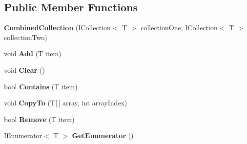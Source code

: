 \subsection*{Public Member Functions}
\begin{DoxyCompactItemize}
\item 
\hypertarget{class_cloud_api_public_1_1_model_1_1_combined_collection_3_01_t_01_4_abc00f26a4aadc898fa9617be0cee7f1b}{{\bfseries Combined\-Collection} (I\-Collection$<$ T $>$ collection\-One, I\-Collection$<$ T $>$ collection\-Two)}\label{class_cloud_api_public_1_1_model_1_1_combined_collection_3_01_t_01_4_abc00f26a4aadc898fa9617be0cee7f1b}

\item 
\hypertarget{class_cloud_api_public_1_1_model_1_1_combined_collection_3_01_t_01_4_a5852fb86510a176108a77257db1bef6d}{void {\bfseries Add} (T item)}\label{class_cloud_api_public_1_1_model_1_1_combined_collection_3_01_t_01_4_a5852fb86510a176108a77257db1bef6d}

\item 
\hypertarget{class_cloud_api_public_1_1_model_1_1_combined_collection_3_01_t_01_4_a31a9fdcf826637b5692bb74e1778424e}{void {\bfseries Clear} ()}\label{class_cloud_api_public_1_1_model_1_1_combined_collection_3_01_t_01_4_a31a9fdcf826637b5692bb74e1778424e}

\item 
\hypertarget{class_cloud_api_public_1_1_model_1_1_combined_collection_3_01_t_01_4_a6e7a32b31b2b719dc766ee80692a8363}{bool {\bfseries Contains} (T item)}\label{class_cloud_api_public_1_1_model_1_1_combined_collection_3_01_t_01_4_a6e7a32b31b2b719dc766ee80692a8363}

\item 
\hypertarget{class_cloud_api_public_1_1_model_1_1_combined_collection_3_01_t_01_4_aee4e3948ceac9a02bc71eacba41ded0d}{void {\bfseries Copy\-To} (T\mbox{[}$\,$\mbox{]} array, int array\-Index)}\label{class_cloud_api_public_1_1_model_1_1_combined_collection_3_01_t_01_4_aee4e3948ceac9a02bc71eacba41ded0d}

\item 
\hypertarget{class_cloud_api_public_1_1_model_1_1_combined_collection_3_01_t_01_4_af4382d8f648312cc3258ab30eaef2ea3}{bool {\bfseries Remove} (T item)}\label{class_cloud_api_public_1_1_model_1_1_combined_collection_3_01_t_01_4_af4382d8f648312cc3258ab30eaef2ea3}

\item 
\hypertarget{class_cloud_api_public_1_1_model_1_1_combined_collection_3_01_t_01_4_a9c233e5f24cdfce6192e0053bb556ad2}{I\-Enumerator$<$ T $>$ {\bfseries Get\-Enumerator} ()}\label{class_cloud_api_public_1_1_model_1_1_combined_collection_3_01_t_01_4_a9c233e5f24cdfce6192e0053bb556ad2}

\end{DoxyCompactItemize}
